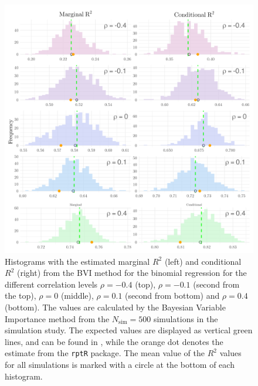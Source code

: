 
\begin{figure}[H]
  \centering
  \includegraphics[width=1.1\linewidth]{Figures/Simulation study/R2_combined_poisson.png}
  \caption{Histograms with the estimated marginal $R^2$ (left) and conditional $R^2$ (right) from the BVI method for the binomial regression for the different correlation levels $\rho=-0.4$ (top), $\rho=-0.1$ (second from the top), $\rho=0$ (middle), $\rho=0.1$ (second from bottom) and $\rho=0.4$ (bottom). The values are calculated by the Bayesian Variable Importance method from the $N_{\text{sim}}=500$ simulations in the simulation study. The expected values are displayed as vertical green lines, and can be found in , while the orange dot denotes the estimate from the \texttt{rptR} package. The mean value of the $R^2$ values for all simulations is marked with a circle at the bottom of each histogram.}
  \label{fig:r2_combined_poisson}
\end{figure}


